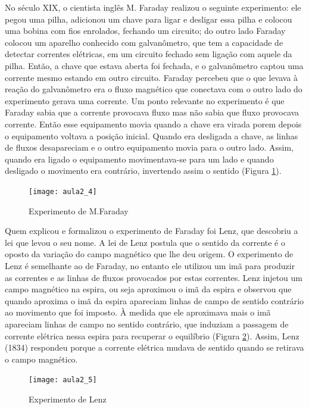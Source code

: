 No século XIX, o cientista inglês M. Faraday realizou o seguinte experimento: ele pegou uma pilha, adicionou um chave para ligar e desligar essa pilha e colocou uma bobina com fios enrolados, fechando um circuito; do outro lado Faraday colocou um aparelho conhecido com galvanômetro, que tem a capacidade de detectar correntes elétricas, em um circuito fechado sem ligação com aquele da pilha. Então, a chave que estava aberta foi fechada, e o galvanômetro captou uma corrente mesmo estando em outro circuito. Faraday percebeu que o que levava à reação do galvanômetro era o fluxo magnético que conectava com o outro lado do experimento gerava uma corrente. Um ponto relevante no experimento é que Faraday sabia que a corrente provocava fluxo mas não sabia que fluxo provocava corrente. Então esse equipamento movia quando a chave era virada porem depois o equipamento voltava a posição inicial. Quando era desligada a chave, as linhas de fluxos desapareciam e o outro equipamento movia para o outro lado. Assim, quando era ligado o equipamento movimentava-se para um lado e quando desligado o movimento era contrário, invertendo assim o sentido (Figura \ref{fig:aula2_4}). 
\begin{figure}[H]
\begin{centering}
\texttt{[image: aula2\_4]}\protect\caption{\label{fig:aula2_4}Experimento de M.Faraday }
\end{centering}

\end{figure}
Quem explicou e formalizou o experimento de Faraday foi Lenz, que descobriu a lei que levou o seu nome. A lei de Lenz postula que o sentido da corrente é o oposto da variação do campo magnético que lhe deu origem. O
experimento de Lenz é semelhante ao de Faraday, no entanto ele utilizou um imã para produzir as correntes e as linhas de fluxos provocados por estas correntes. Lenz injetou um campo magnético na espira, ou seja aproximou
o imã da espira e observou que quando aproxima o imã da espira
apareciam linhas de campo de sentido contrário ao movimento que foi
imposto. À medida que ele aproximava mais o imã apareciam linhas de campo no
sentido contrário, que induziam a passagem de corrente
elétrica nessa espira para recuperar o equilíbrio (Figura \ref{fig:aula2_5}). Assim,
Lenz (1834) respondeu porque a corrente elétrica mudava de sentido
quando se retirava o campo magnético.
\begin{figure}[H]
\begin{centering}
\texttt{[image: aula2\_5]}\protect\caption{\label{fig:aula2_5}Experimento de Lenz }
\end{centering}

\end{figure}

